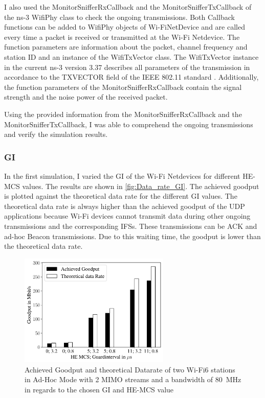 I also used the MonitorSnifferRxCallback and the MonitorSnifferTxCallback of the ns-3 WifiPhy class to check the ongoing transmissions.
Both Callback functions can be added to WifiPhy objects of Wi-FiNetDevice and are called every time a packet is received or transmitted at the Wi-Fi Netdevice.
The function parameters are information about the packet, channel frequency and station ID and an instance of the WifiTxVector class.
The WifiTxVector instance in the current ns-3 version 3.37 describes all parameters of the transmission in accordance to the TXVECTOR field of the IEEE 802.11 standard \cite{ieee_standard_2021ax}. Additionally, the function parameters of the MonitorSnifferRxCallback contain the signal strength and
the noise power of the received packet.

Using the provided information from the MonitorSnifferRxCallback and the MonitorSnifferTxCallback, I was able to comprehend the ongoing transmissions and
verify the simulation results.

\subsubsection*{\acf{GI}}

In the first simulation, I varied the \ac{GI} of the Wi-Fi Netdevices for different \ac{HE}-\ac{MCS} values.
The results are shown in \autoref{fig:Data_rate_GI}.
The achieved goodput is plotted against the theoretical data rate for the different \ac{GI} values.
The theoretical data rate is always higher than the achieved goodput of the \ac{UDP} applications because Wi-Fi devices
cannot transmit data during other ongoing transmissions and the corresponding \acp{IFS}.
These transmissions can be \ac{ACK} and ad-hoc Beacon transmissions.
Due to this waiting time, the goodput is lower than the theoretical data rate.
\begin{figure}[H]
   \centering
   \includegraphics[width=0.64\textwidth]{figures/gi_dataRate_simulation.pdf}
   \caption{Achieved Goodput and theoretical Datarate of two Wi-Fi6 stations in Ad-Hoc Mode
   with \num{2} \acf{MIMO} streams and a bandwidth of \SI{80}{\mega\hertz} in regards to the chosen \acf{GI} and \ac{HE}-\ac{MCS} value}%
   \label{fig:Data_rate_GI}%
\end{figure}

